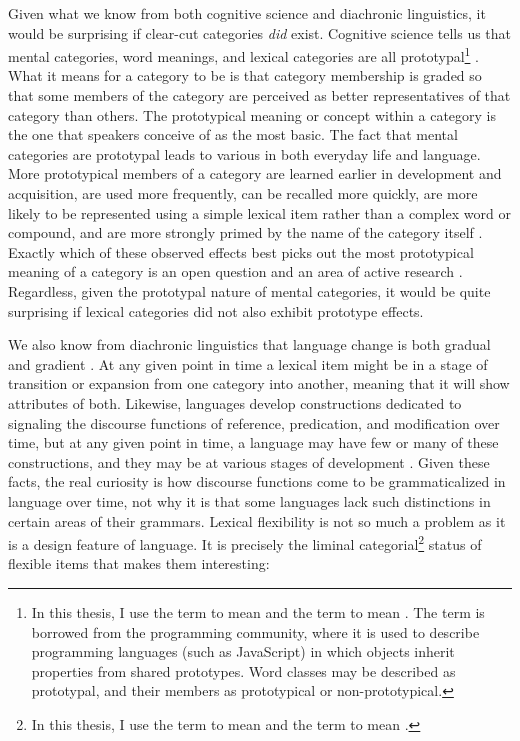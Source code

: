 Given what we know from both cognitive science and diachronic linguistics, it would be surprising if clear-cut categories \emph{did} exist. Cognitive science tells us that mental categories, word meanings, and lexical categories are all prototypal\footnote{In this thesis, I use the term  to mean  and the term  to mean . The term  is borrowed from the programming community, where it is used to describe programming languages (such as JavaScript) in which objects inherit properties from shared prototypes. Word classes may be described as prototypal, and their members as prototypical or non-prototypical.} \parencite{Taylor2003}. What it means for a category to be  is that category membership is graded so that some members of the category are perceived as better representatives of that category than others. The prototypical meaning or concept within a category is the one that speakers conceive of as the most basic. The fact that mental categories are prototypal leads to various  in both everyday life and language. More prototypical members of a category are learned earlier in development and acquisition, are used more frequently, can be recalled more quickly, are more likely to be represented using a simple lexical item rather than a complex word or compound, and are more strongly primed by the name of the category itself \parencite[78--79]{CroftCruse2004}. Exactly which of these observed effects best picks out the most prototypical meaning of a category is an open question and an area of active research \parencites[75]{Gries2006}[58--59]{GriesDivjak2009}. Regardless, given the prototypal nature of mental categories, it would be quite surprising if lexical categories did not also exhibit prototype effects.

We also know from diachronic linguistics that language change is both gradual and gradient \parencites{HopperTraugott2003}{TraugottTrousdale2010}. At any given point in time a lexical item might be in a stage of transition or expansion from one category into another, meaning that it will show attributes of both. Likewise, languages develop constructions dedicated to signaling the discourse functions of reference, predication, and modification over time, but at any given point in time, a language may have few or many of these constructions, and they may be at various stages of development \parencite{Vogel2000}. Given these facts, the real curiosity is how discourse functions come to be grammaticalized in language over time, not why it is that some languages lack such distinctions in certain areas of their grammars. Lexical flexibility is not so much a problem as it is a design feature of language. It is precisely the liminal categorial\footnote{In this thesis, I use the term  to mean  and the term  to mean .} status of flexible items that makes them interesting:

